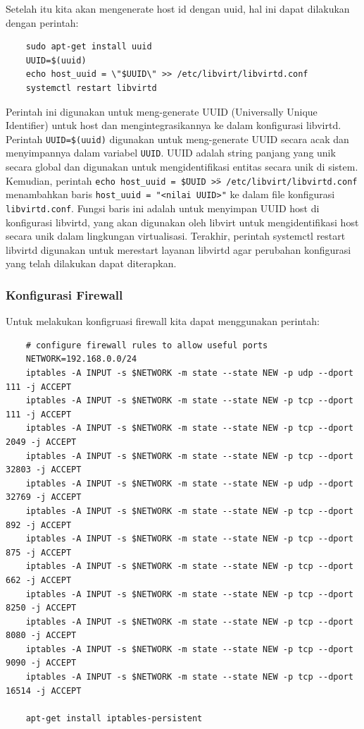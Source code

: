 Setelah itu kita akan mengenerate host id dengan uuid, hal ini dapat dilakukan dengan perintah:

\begin{lstlisting}
    sudo apt-get install uuid
    UUID=$(uuid)
    echo host_uuid = \"$UUID\" >> /etc/libvirt/libvirtd.conf
    systemctl restart libvirtd
\end{lstlisting}

Perintah ini digunakan untuk meng-generate UUID (Universally Unique Identifier) untuk host dan mengintegrasikannya ke dalam konfigurasi libvirtd. Perintah \texttt{UUID=\$(uuid)} digunakan untuk meng-generate UUID secara acak dan menyimpannya dalam variabel \texttt{UUID}. UUID adalah string panjang yang unik secara global dan digunakan untuk mengidentifikasi entitas secara unik di sistem. Kemudian, perintah \texttt{echo host\_uuid = \" \$UUID \"  >> /etc/libvirt/libvirtd.conf} menambahkan baris \texttt{host\_uuid = "<nilai UUID>"} ke dalam file konfigurasi \texttt{libvirtd.conf}. Fungsi baris ini adalah untuk menyimpan UUID host di konfigurasi libvirtd, yang akan digunakan oleh libvirt untuk mengidentifikasi host secara unik dalam lingkungan virtualisasi. Terakhir, perintah systemctl restart libvirtd digunakan untuk merestart layanan libvirtd agar perubahan konfigurasi yang telah dilakukan dapat diterapkan.

\subsubsection{Konfigurasi Firewall}
Untuk melakukan konfigruasi firewall kita dapat menggunakan perintah:

\begin{lstlisting}
    # configure firewall rules to allow useful ports
    NETWORK=192.168.0.0/24
    iptables -A INPUT -s $NETWORK -m state --state NEW -p udp --dport 111 -j ACCEPT
    iptables -A INPUT -s $NETWORK -m state --state NEW -p tcp --dport 111 -j ACCEPT
    iptables -A INPUT -s $NETWORK -m state --state NEW -p tcp --dport 2049 -j ACCEPT
    iptables -A INPUT -s $NETWORK -m state --state NEW -p tcp --dport 32803 -j ACCEPT
    iptables -A INPUT -s $NETWORK -m state --state NEW -p udp --dport 32769 -j ACCEPT
    iptables -A INPUT -s $NETWORK -m state --state NEW -p tcp --dport 892 -j ACCEPT
    iptables -A INPUT -s $NETWORK -m state --state NEW -p tcp --dport 875 -j ACCEPT
    iptables -A INPUT -s $NETWORK -m state --state NEW -p tcp --dport 662 -j ACCEPT
    iptables -A INPUT -s $NETWORK -m state --state NEW -p tcp --dport 8250 -j ACCEPT
    iptables -A INPUT -s $NETWORK -m state --state NEW -p tcp --dport 8080 -j ACCEPT
    iptables -A INPUT -s $NETWORK -m state --state NEW -p tcp --dport 9090 -j ACCEPT
    iptables -A INPUT -s $NETWORK -m state --state NEW -p tcp --dport 16514 -j ACCEPT
    
    apt-get install iptables-persistent
\end{lstlisting}

